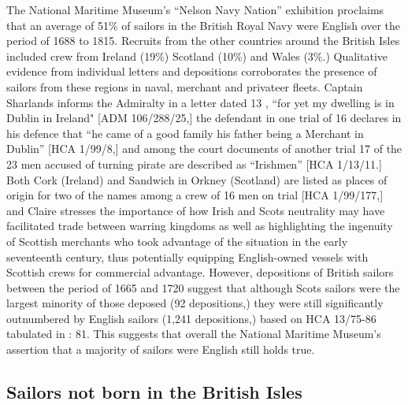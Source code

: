 The National Maritime Museum’s “Nelson Navy Nation” exhibition proclaims that an average of 51\% of sailors in the British Royal Navy were English over the period of 1688 to 1815. Recruits from the other countries around the British Isles included crew from Ireland (19\%) Scotland (10\%) and Wales (3\%.) Qualitative evidence from individual letters and depositions corroborates the presence of sailors from these regions in naval, merchant and privateer fleets. Captain Sharlands informs the Admiralty in a letter dated 13 \citealt{April1673}, “for yet my dwelling is in Dublin in Ireland" [ADM 106/288/25,] the defendant in one trial of 16 \citealt{August1727} declares in his defence that “he came of a good family his father being a Merchant in Dublin” [HCA 1/99/8,] and among the court documents of another trial 17 of the 23 men accused of turning pirate are described as “Irishmen” [HCA 1/13/11.] Both Cork (Ireland) and Sandwich in Orkney (Scotland) are listed as places of origin for two of the names among a crew of 16 men on trial [HCA 1/99/177,] and Claire \citet{McLoughlin2015} stresses the importance of how Irish and Scots neutrality may have facilitated trade between warring kingdoms as well as highlighting the ingenuity of Scottish merchants who took advantage of the situation in the early seventeenth century, thus potentially equipping English-owned vessels with Scottish crews for commercial advantage. However, depositions of British sailors between the period of 1665 and 1720 suggest that although Scots sailors were the largest minority of those deposed (92 depositions,) they were still significantly outnumbered by English sailors (1,241 depositions,) based on HCA 13/75-86 tabulated in \citealt{Earle1993}: 81. This suggests that overall the National Maritime Museum’s assertion that a majority of sailors were English still holds true.  

\subsection{{Sailors} {not} {born} {in} {the} {British} {Isles}}%

